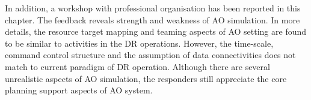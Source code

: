 
In addition, a workshop with professional organisation has been reported in this chapter. The feedback reveals strength and weakness of AO simulation. In more details, the resource target mapping and teaming aspects of AO setting are found to be similar to activities in the DR operations. However, the time-scale, command control structure and the assumption of data connectivities does not match to current paradigm of DR operation. Although there are several unrealistic aspects of AO simulation, the responders still appreciate the core planning support aspects of AO system.\\

